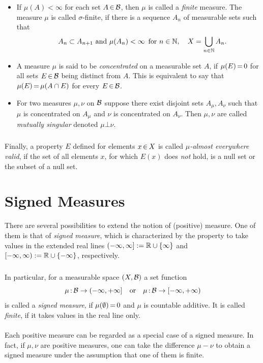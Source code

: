 \documentclass[11pt,twoside]{article}
\begin{document}
\begin{itemize}[leftmargin=22pt]
\item[1.]
If $\mu(A) < \infty$ for each set $A {\,\in\,} {\mathcal{B}}$,
then $\mu$ is called a \textit{finite} measure.
The measure $\mu$ is called $\sigma$-finite,
if there is a sequence ${A_n}$ of measurable sets
such that
\[
\quad A_n \subset A_{n+1} \mbox{ and }
\mu(A_n) < \infty \, \mbox{ for } n \in {\mathbb{N}},
\quad X = \bigcup_{n \in {\mathbb{N}}} A_n.
\]

\item[2.]
A measure $\mu$ is said to be \textit{concentrated} on a measurable set $A$,
if $\mu(E) {\,=\,} 0$ for all sets $E {\,\in\,} {\mathcal{B}}$ being distinct from $A$.
This is equivalent to say that
$\mu(E) {\,=\,} \mu(A \cap E)$ for every $E {\,\in\,} {\mathcal{B}}$.

\item[3.]
For two measures $\mu,\nu$ on ${\mathcal{B}}$
suppose there exist disjoint sets $A_{\mu},A_{\nu}$ such that
$\mu$ is concentrated on $A_{\mu}$ and
$\nu$ is concentrated on $A_{\nu}$.
Then $\mu, \nu$ are called \textit{mutually singular} denoted $\mu \bot \nu$.
\end{itemize}

\subparagraph{}
Finally,
a property $E$ defined for elements $x {\,\in\,} X$ is called
\textit{$\mu$-almost everywhere valid},
if the set of all elements $x$,
for which $E(x)$ does \textit{not} hold,
is a null set or the subset of a null set.

\section{Signed Measures}
There are several possibilities to extend the notion of (positive) measure.
One of them is that of \textit{signed measure},
which is characterized by the property to take values in the extended real lines
$(-\infty,\infty] := {\mathbb{R}} \cup \{\infty\}$
and
$[-\infty,\infty) := {\mathbb{R}} \cup \{-\infty\}$,
respectively.

\subparagraph{}
In particular,
for a measurable space $(X,{\mathcal{B}})$ a set function
\[
\mu {\,:\,} {\mathcal{B}} \to (-\infty,+ \infty] \quad \mbox{or} \quad
\mu {\,:\,} {\mathcal{B}} \to [-\infty,+ \infty)
\]
is called a \textit{signed measure},
if $\mu(\emptyset) {\,=\,} 0$ and $\mu$ is countable additive.
It is called \textit{finite},
if it takes values in the real line only.

\paragraph{} %
Each positive measure can be regarded as a special case of a signed measure.
In fact,
if $\mu,\nu$ are positive measures,
one can take the difference $\mu - \nu$ to obtain a signed measure
under the assumption that one of them is finite.
\end{document}
